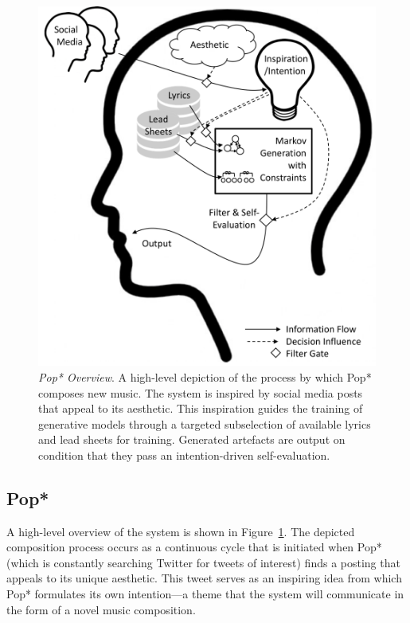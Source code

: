 \documentclass[phd,electronic,oneside,twosidetoc,letterpaper,chaptercenter,parttop,lol,lof,lot]{byumsphd}
\begin{document}
\begin{figure}
    \centering
    \includegraphics[width=\linewidth]{head}
    \caption{\textit{Pop* Overview}. A high-level depiction of the process by which Pop* composes new music. The system is inspired by social media posts that appeal to its aesthetic. This inspiration guides the training of generative models through a targeted subselection of available lyrics and lead sheets for training. Generated artefacts are output on condition that they pass an intention-driven self-evaluation.}
    \label{fig:head}
\end{figure}

\subsection{Pop*}

A high-level overview of the system is shown in Figure~\ref{fig:head}. The depicted composition process occurs as a continuous cycle that is initiated when Pop* (which is constantly searching Twitter for tweets of interest) finds a posting that appeals to its unique aesthetic. This tweet serves as an inspiring idea from which Pop* formulates its own intention---a theme that the system will communicate in the form of a novel music composition. 
\end{document}
